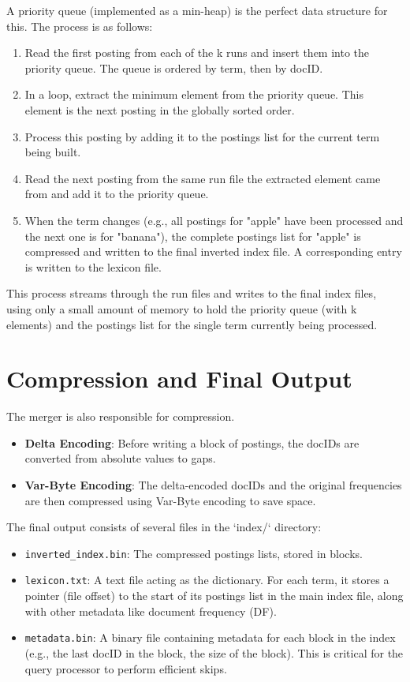 \documentclass[11pt, a4paper]{report}
\begin{document}
A priority queue (implemented as a min-heap) is the perfect data structure for this. The process is as follows:
\begin{enumerate}
    \item Read the first posting from each of the k runs and insert them into the priority queue. The queue is ordered by term, then by docID.
    \item In a loop, extract the minimum element from the priority queue. This element is the next posting in the globally sorted order.
    \item Process this posting by adding it to the postings list for the current term being built.
    \item Read the next posting from the same run file the extracted element came from and add it to the priority queue.
    \item When the term changes (e.g., all postings for "apple" have been processed and the next one is for "banana"), the complete postings list for "apple" is compressed and written to the final inverted index file. A corresponding entry is written to the lexicon file.
\end{enumerate}

This process streams through the run files and writes to the final index files, using only a small amount of memory to hold the priority queue (with k elements) and the postings list for the single term currently being processed.

\section{Compression and Final Output}
The merger is also responsible for compression.
\begin{itemize}
    \item \textbf{Delta Encoding}: Before writing a block of postings, the docIDs are converted from absolute values to gaps.
    \item \textbf{Var-Byte Encoding}: The delta-encoded docIDs and the original frequencies are then compressed using Var-Byte encoding to save space.
\end{itemize}

The final output consists of several files in the `index/` directory:
\begin{itemize}
    \item \lstinline{inverted_index.bin}: The compressed postings lists, stored in blocks.
    \item \lstinline{lexicon.txt}: A text file acting as the dictionary. For each term, it stores a pointer (file offset) to the start of its postings list in the main index file, along with other metadata like document frequency (DF).
    \item \lstinline{metadata.bin}: A binary file containing metadata for each block in the index (e.g., the last docID in the block, the size of the block). This is critical for the query processor to perform efficient skips.
\end{itemize}
\end{document}

